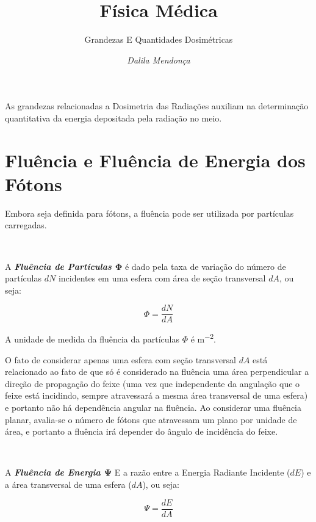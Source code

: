 \documentclass[11pt,a4paper]{article}
\title{Física Médica}
\author{Grandezas E Quantidades Dosimétricas\nocite{*}}
\date{\textit{Dalila Mendonça}}
\newcounter{exemplo}
\begin{document}
	\maketitle

    As grandezas relacionadas a Dosimetria das Radiações auxiliam na determinação quantitativa da energia depositada pela radiação no meio. 
    
    
    \section{Fluência e Fluência de Energia dos Fótons}

        Embora seja definida para fótons, a fluência pode ser utilizada por partículas carregadas. 

        \

        A \textit{\textbf{\textcolor{CarnationPink}{Fluência de Partículas $\mathbf{\Phi}$}}} é dado pela taxa de variação do número de partículas $dN$ incidentes em uma esfera com área de seção transversal $dA$, ou seja:

			\begin{equation}
			\Phi  = \frac{d N}{d A} 
			\end{equation}
		
		\begin{exemplo}[Unidade]
			A unidade de medida da fluência da partículas	$\Phi$ é \unit{m^{-2}}.
		\end{exemplo}


    	\noindent  O fato de considerar apenas uma esfera com seção transversal $dA$ está relacionado ao fato de que só é considerado na fluência uma área perpendicular a direção de propagação do feixe (uma vez que independente da angulação que o feixe está incidindo, sempre atravessará a mesma área transversal de uma esfera) e portanto não há dependência angular na fluência. Ao considerar uma fluência planar, avalia-se o número de fótons que atravessam um plano por unidade de área, e portanto a fluência irá depender do ângulo de incidência do feixe. 

      	\

      	A \textit{\textbf{\textcolor{CarnationPink}{Fluência de Energia $\mathbf{\Psi}$}}} E a razão entre a Energia Radiante Incidente ($dE$) e a área transversal de uma esfera ($dA$), ou seja:

			\begin{equation}
			\Psi = \frac{d E}{d A}
			\end{equation}
\end{document}
